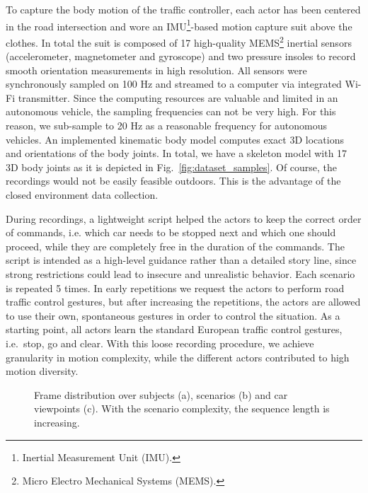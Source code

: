 \documentclass[letterpaper, 10 pt, conference]{ieeeconf}
\begin{document}
To capture the body motion of the traffic controller, each actor has been centered in the road intersection and wore an IMU\footnote{Inertial Measurement Unit (IMU).}-based motion capture suit above the clothes. In total the suit is composed of 17 high-quality MEMS\footnote{Micro Electro Mechanical Systems (MEMS).} inertial sensors (accelerometer, magnetometer and gyroscope) and two pressure insoles to record smooth orientation measurements in high resolution. All sensors were synchronously sampled on 100 Hz and streamed to a computer via integrated Wi-Fi transmitter. Since the computing resources are valuable and limited in an autonomous vehicle, the sampling frequencies can not be very high. For this reason, we sub-sample to 20 Hz as a reasonable frequency for autonomous vehicles. An implemented kinematic body model computes exact 3D locations and orientations of the body joints. In total, we have a skeleton model with 17 3D body joints as it is depicted in Fig.~\ref{fig:dataset_samples}. Of course, the recordings would not be easily feasible outdoors. This is the advantage of the closed environment data collection.

During recordings, a lightweight script helped the actors to keep the correct order of commands, i.e. which car needs to be stopped next and which one should proceed, while they are completely free in the duration of the commands. The script is intended as a high-level guidance rather than a detailed story line, since strong restrictions could lead to insecure and unrealistic behavior. Each scenario is repeated 5 times. In early repetitions we request the actors to perform road traffic control gestures, but after increasing the repetitions, the actors are allowed to use their own, spontaneous gestures in order to control the situation. As a starting point, all actors learn the standard European traffic control gestures, i.e.~stop, go and clear. With this loose recording procedure, we achieve granularity in motion complexity, while the different actors contributed to high motion diversity.

\begin{figure}[t]
    \centering
    \hfill
    \hfill
    \caption{Frame distribution over subjects (a), scenarios (b) and car viewpoints (c). With the scenario complexity, the sequence length is increasing.}
    \label{fig:frame_distribution}
\end{figure}
\end{document}
